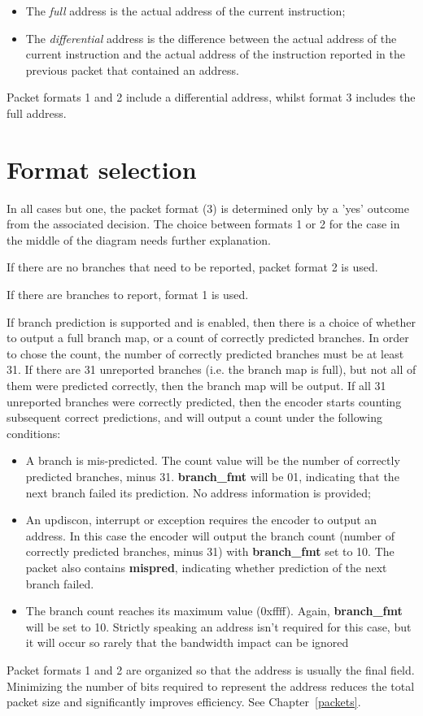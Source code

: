 \begin{itemize}
  \item The \textit{full} address is the actual address of the current instruction;
  \item The \textit{differential} address is the difference between the actual address of 
    the current instruction and the actual address of the instruction reported in the 
    previous packet that contained an address.
\end{itemize}

Packet formats 1 and 2 include a differential address, whilst format 3 includes the full address.

\section{Format selection} \label{format-selection}

In all cases but one, the packet format (3) is determined only by a 'yes' outcome from the 
associated decision.  The choice between formats 1 or 2 for the case in the middle of the 
diagram needs further explanation.  

If there are no branches that need to be reported, packet format 2 is used.  

If there are branches to report, format 1 is used.

If branch prediction is supported and is enabled, then there is a choice of whether to output a 
full branch map, or a count of correctly predicted branches.  In order to chose the count, the number 
of correctly predicted branches must be at least 31.  If there are 31 unreported branches (i.e. the branch
map is full), but not all of them were predicted correctly, then the branch map will be output.
If all 31 unreported branches were correctly predicted, then the encoder starts counting
subsequent correct predictions, and will output a count under the following conditions:

\begin{itemize}
  \item A branch is mis-predicted.  The count value will be the number of correctly predicted branches, 
    minus 31.  \textbf{branch\_fmt} will be 01, indicating that the next branch failed its prediction.
   No address information is provided;
  \item An updiscon, interrupt or exception requires the encoder to output an address.  In this case 
    the encoder will output the branch count (number of correctly predicted branches, minus 31) with 
    \textbf{branch\_fmt} set to 10.  The packet also contains \textbf{mispred}, indicating whether 
    prediction of the next branch failed.
  \item The branch count reaches its maximum value (0xffff).  Again, \textbf{branch\_fmt} will be set to 10.
    Strictly speaking an address isn't required for this case, but it will occur so rarely that the bandwidth 
    impact can be ignored
\end{itemize}

Packet formats 1 and 2 are organized so that the address is usually the final field.  Minimizing the 
number of bits required to represent the address reduces the total packet size and significantly
improves efficiency.  See Chapter~\ref{packets}.

